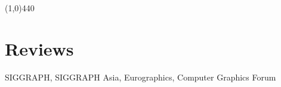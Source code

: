 \documentclass[margin,line]{resume}
\begin{document}
\begin{resume}


    \vspace{-5.0mm}
    \line(1,0){440}
    \vspace{-5.0mm}

    \section{\mysidestyle Reviews}

    SIGGRAPH, SIGGRAPH Asia, Eurographics, Computer Graphics Forum                   \\






\end{resume}
\end{document}
